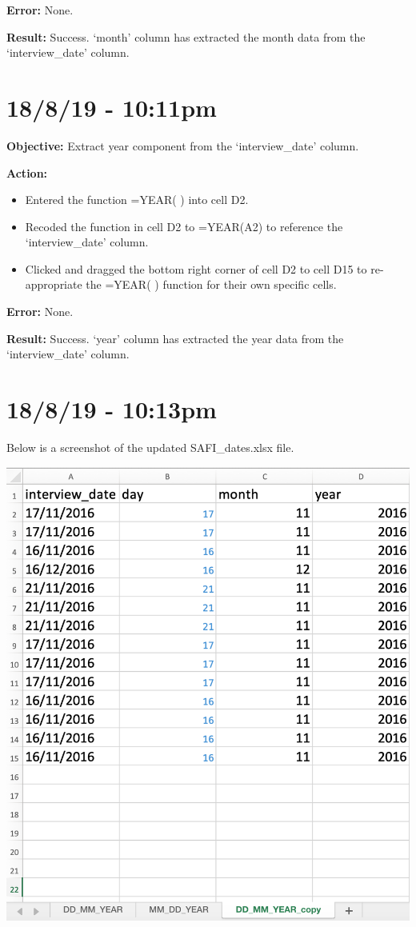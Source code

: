\documentclass{article}
\begin{document}
\textbf{Error:} None.

\textbf{Result:} Success. ‘month’ column has extracted the month data from the ‘interview\_date’ column.

\section*{18/8/19 - 10:11pm}

\textbf{Objective:} Extract year component from the ‘interview\_date’ column.

\textbf{Action:}
\begin{itemize}
    \item Entered the function =YEAR( ) into cell D2.
    \item Recoded the function in cell D2 to =YEAR(A2) to reference the ‘interview\_date’ column.
    \item Clicked and dragged the bottom right corner of cell D2 to cell D15 to re-appropriate the =YEAR( ) function for their own specific cells.
\end{itemize}

\textbf{Error:} None.

\textbf{Result:} Success. ‘year’ column has extracted the year data from the ‘interview\_date’ column.

\section*{18/8/19 - 10:13pm}

Below is a screenshot of the updated SAFI\_dates.xlsx file.

\includegraphics[width=\textwidth]{figa.png}
\end{document}
